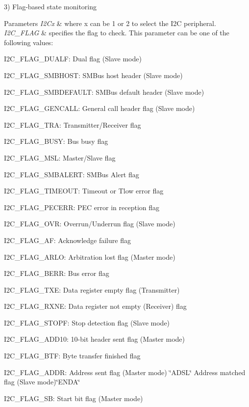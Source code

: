 3) Flag-\/based state monitoring 
\begin{DoxyParams}{Parameters}
{\em I2\+Cx} & where x can be 1 or 2 to select the I2C peripheral. \\
\hline
{\em I2\+C\+\_\+\+F\+L\+AG} & specifies the flag to check. This parameter can be one of the following values\+: \begin{DoxyItemize}
\item I2\+C\+\_\+\+F\+L\+A\+G\+\_\+\+D\+U\+A\+LF\+: Dual flag (Slave mode) \item I2\+C\+\_\+\+F\+L\+A\+G\+\_\+\+S\+M\+B\+H\+O\+ST\+: S\+M\+Bus host header (Slave mode) \item I2\+C\+\_\+\+F\+L\+A\+G\+\_\+\+S\+M\+B\+D\+E\+F\+A\+U\+LT\+: S\+M\+Bus default header (Slave mode) \item I2\+C\+\_\+\+F\+L\+A\+G\+\_\+\+G\+E\+N\+C\+A\+LL\+: General call header flag (Slave mode) \item I2\+C\+\_\+\+F\+L\+A\+G\+\_\+\+T\+RA\+: Transmitter/\+Receiver flag \item I2\+C\+\_\+\+F\+L\+A\+G\+\_\+\+B\+U\+SY\+: Bus busy flag \item I2\+C\+\_\+\+F\+L\+A\+G\+\_\+\+M\+SL\+: Master/\+Slave flag \item I2\+C\+\_\+\+F\+L\+A\+G\+\_\+\+S\+M\+B\+A\+L\+E\+RT\+: S\+M\+Bus Alert flag \item I2\+C\+\_\+\+F\+L\+A\+G\+\_\+\+T\+I\+M\+E\+O\+UT\+: Timeout or Tlow error flag \item I2\+C\+\_\+\+F\+L\+A\+G\+\_\+\+P\+E\+C\+E\+RR\+: P\+EC error in reception flag \item I2\+C\+\_\+\+F\+L\+A\+G\+\_\+\+O\+VR\+: Overrun/\+Underrun flag (Slave mode) \item I2\+C\+\_\+\+F\+L\+A\+G\+\_\+\+AF\+: Acknowledge failure flag \item I2\+C\+\_\+\+F\+L\+A\+G\+\_\+\+A\+R\+LO\+: Arbitration lost flag (Master mode) \item I2\+C\+\_\+\+F\+L\+A\+G\+\_\+\+B\+E\+RR\+: Bus error flag \item I2\+C\+\_\+\+F\+L\+A\+G\+\_\+\+T\+XE\+: Data register empty flag (Transmitter) \item I2\+C\+\_\+\+F\+L\+A\+G\+\_\+\+R\+X\+NE\+: Data register not empty (Receiver) flag \item I2\+C\+\_\+\+F\+L\+A\+G\+\_\+\+S\+T\+O\+PF\+: Stop detection flag (Slave mode) \item I2\+C\+\_\+\+F\+L\+A\+G\+\_\+\+A\+D\+D10\+: 10-\/bit header sent flag (Master mode) \item I2\+C\+\_\+\+F\+L\+A\+G\+\_\+\+B\+TF\+: Byte transfer finished flag \item I2\+C\+\_\+\+F\+L\+A\+G\+\_\+\+A\+D\+DR\+: Address sent flag (Master mode) \char`\"{}\+A\+D\+S\+L\char`\"{} Address matched flag (Slave mode)\char`\"{}\+E\+N\+D\+A\char`\"{} \item I2\+C\+\_\+\+F\+L\+A\+G\+\_\+\+SB\+: Start bit flag (Master mode) \end{DoxyItemize}
\\
\hline
\end{DoxyParams}

